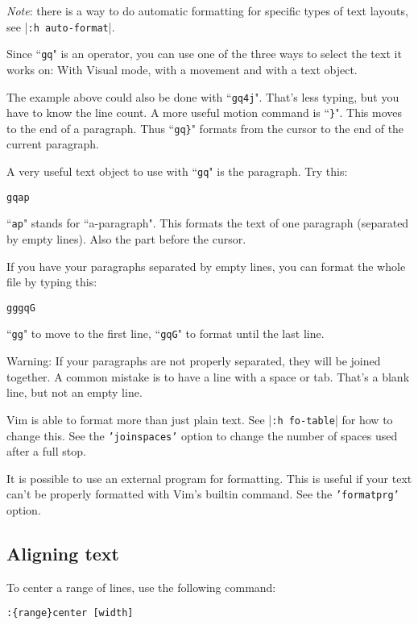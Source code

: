 \emph{Note}: there is a way to do automatic formatting for specific types of text layouts, see |\texttt{:h auto-format}|.

Since ``\texttt{gq}" is an operator, you can use one of the three ways to select the text it works on: With Visual mode, with a movement and with a text object.

The example above could also be done with ``\texttt{gq4j}".
That's less typing, but you have to know the line count.
A more useful motion command is ``\texttt{\}}".
This moves to the end of a paragraph.
Thus ``\texttt{gq\}}" formats from the cursor to the end of the current paragraph.

A very useful text object to use with ``\texttt{gq}" is the paragraph.
Try this:

\begin{Verbatim}[samepage=true]
 gqap
\end{Verbatim}

``\texttt{ap}" stands for ``a-paragraph".
This formats the text of one paragraph (separated by empty lines).
Also the part before the cursor.

If you have your paragraphs separated by empty lines, you can format the whole file by typing this:

\begin{Verbatim}[samepage=true]
 gggqG
\end{Verbatim}

``\texttt{gg}" to move to the first line, ``\texttt{gqG}" to format until the last line.

Warning: If your paragraphs are not properly separated, they will be joined together.
A common mistake is to have a line with a space or tab.
That's a blank line, but not an empty line.

Vim is able to format more than just plain text.
See |\texttt{:h fo-table}| for how to change this.
See the \texttt{'joinspaces'} option to change the number of spaces used after a full stop.

It is possible to use an external program for formatting.
This is useful if your text can't be properly formatted with Vim's builtin command.
See the \texttt{'formatprg'} option.
\subsection{Aligning text}
To center a range of lines, use the following command:

\begin{Verbatim}[samepage=true]
 :{range}center [width]
\end{Verbatim}

